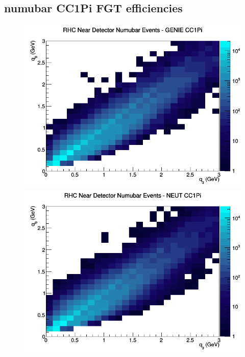 \subsection{numubar CC1Pi FGT efficiencies}
\begin{figure}[h]
\includegraphics[width=\linewidth]{eff_q0_q3/FGT/CC1Pi_RHC_ND_numubar_q3_q0_GENIE.png}
\endminipage
{}
\includegraphics[width=\linewidth]{eff_q0_q3/FGT/CC1Pi_RHC_ND_numubar_q3_q0_NEUT.png}
\endminipage
{}

\end{figure}
